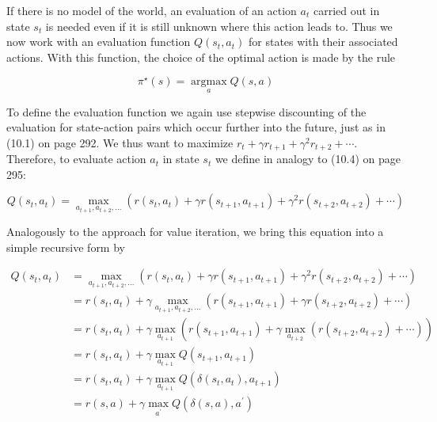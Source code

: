 \documentclass[10pt]{book}
\begin{document}
\begin{center}
\begin{enumerate}
\begin{center}
\begin{center}
\begin{center}
\begin{center}
If there is no model of the world, an evaluation of an action $a_{t}$ carried out in state $s_{t}$ is needed even if it is still unknown where this action leads to. Thus we now work with an evaluation function $Q\left(s_{t}, a_{t}\right)$ for states with their associated actions. With this function, the choice of the optimal action is made by the rule


\begin{equation*}
\pi^{\star}(s)=\underset{a}{\operatorname{argmax}} Q(s, a) \tag{10.9}
\end{equation*}


To define the evaluation function we again use stepwise discounting of the evaluation for state-action pairs which occur further into the future, just as in (10.1) on page 292. We thus want to maximize $r_{t}+\gamma r_{t+1}+\gamma^{2} r_{t+2}+\cdots$. Therefore, to evaluate action $a_{t}$ in state $s_{t}$ we define in analogy to (10.4) on page 295:


\begin{equation*}
Q\left(s_{t}, a_{t}\right)=\max _{a_{t+1}, a_{t+2}, \ldots}\left(r\left(s_{t}, a_{t}\right)+\gamma r\left(s_{t+1}, a_{t+1}\right)+\gamma^{2} r\left(s_{t+2}, a_{t+2}\right)+\cdots\right) \tag{10.10}
\end{equation*}


Analogously to the approach for value iteration, we bring this equation into a simple recursive form by


\begin{align*}
Q\left(s_{t}, a_{t}\right) & =\max _{a_{t+1}, a_{t+2}, \ldots}\left(r\left(s_{t}, a_{t}\right)+\gamma r\left(s_{t+1}, a_{t+1}\right)+\gamma^{2} r\left(s_{t+2}, a_{t+2}\right)+\cdots\right) \\
& =r\left(s_{t}, a_{t}\right)+\gamma \max _{a_{t+1}, a_{t+2}, \ldots}\left(r\left(s_{t+1}, a_{t+1}\right)+\gamma r\left(s_{t+2}, a_{t+2}\right)+\cdots\right) \\
& =r\left(s_{t}, a_{t}\right)+\gamma \max _{a_{t+1}}\left(r\left(s_{t+1}, a_{t+1}\right)+\gamma \max _{a_{t+2}}\left(r\left(s_{t+2}, a_{t+2}\right)+\cdots\right)\right) \\
& =r\left(s_{t}, a_{t}\right)+\gamma \max _{a_{t+1}} Q\left(s_{t+1}, a_{t+1}\right) \\
& =r\left(s_{t}, a_{t}\right)+\gamma \max _{a_{t+1}} Q\left(\delta\left(s_{t}, a_{t}\right), a_{t+1}\right) \\
& =r(s, a)+\gamma \max _{a^{\prime}} Q\left(\delta(s, a), a^{\prime}\right) \tag{10.11}
\end{align*}



\end{center}
\end{center}
\end{center}
\end{center}
\end{enumerate}
\end{center}
\end{document}
